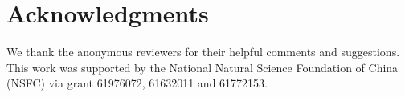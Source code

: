 \documentclass[11pt,a4paper]{article}
\begin{document}
\section*{Acknowledgments}
We thank the anonymous reviewers for their helpful comments and suggestions.
This work was supported by the National Natural Science Foundation of China (NSFC) via grant 61976072, 61632011 and 61772153.






\appendix
\end{document}
